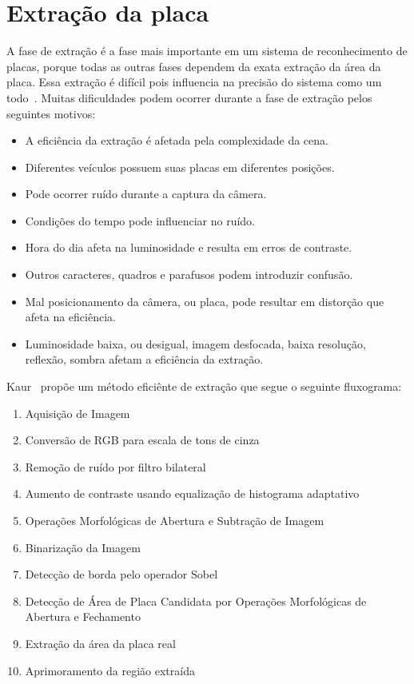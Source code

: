 \section{Extração da placa}
\label{sec:extracao}

A fase de extração é a fase mais importante em um sistema de reconhecimento de
placas, porque todas as outras fases dependem da exata extração da área da
placa. Essa extração é difícil pois influencia na precisão do sistema como um
todo~\cite{kaur2014efficient}. Muitas dificuldades podem ocorrer durante a fase
de extração pelos seguintes motivos:

\begin{itemize}
	\item A eficiência da extração é afetada pela complexidade da cena.
	\item Diferentes veículos possuem suas placas em diferentes posições.
	\item Pode ocorrer ruído durante a captura da câmera.
	\item Condições do tempo pode influenciar no ruído.
	\item Hora do dia afeta na luminosidade e resulta em erros de contraste.
	\item Outros caracteres, quadros e parafusos podem introduzir confusão.
	\item Mal posicionamento da câmera, ou placa, pode resultar em distorção que afeta na eficiência.
	\item Luminosidade baixa, ou desigual, imagem desfocada, baixa resolução, reflexão, sombra afetam a eficiência da extração.
\end{itemize}

Kaur~\cite{kaur2014efficient} propõe um método eficiênte de
extração que segue o seguinte fluxograma:

\begin{enumerate}
	\item Aquisição de Imagem
	\item Conversão de RGB para escala de tons de cinza
	\item Remoção de ruído por filtro bilateral
	\item Aumento de contraste usando equalização de histograma adaptativo
	\item Operações Morfológicas de Abertura e Subtração de Imagem
	\item Binarização da Imagem
	\item Detecção de borda pelo operador Sobel
	\item Detecção de Área de Placa Candidata por Operações Morfológicas de Abertura e Fechamento
	\item Extração da área da placa real
	\item Aprimoramento da região extraída
\end{enumerate}

